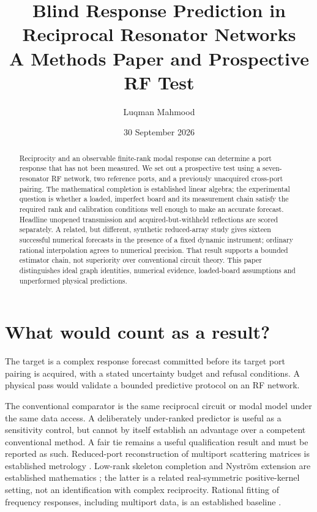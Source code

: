 \documentclass[11pt]{article}
\title{Blind Response Prediction in Reciprocal Resonator Networks\\
A Methods Paper and Prospective RF Test}
\author{Luqman Mahmood}
\date{30 September 2026}
\begin{document}
\maketitle
{}
\begin{abstract}
Reciprocity and an observable finite-rank modal response can determine a
port response that has not been measured. We set out a prospective test
using a seven-resonator RF network, two reference ports, and a previously
unacquired cross-port pairing. The mathematical completion is established
linear algebra; the experimental question is whether a loaded, imperfect
board and its measurement chain satisfy the required rank and calibration
conditions well enough to make an accurate forecast. Headline unopened
transmission and acquired-but-withheld reflections are scored separately.
A related, but different, synthetic reduced-array study gives sixteen successful
numerical forecasts in the presence of a fixed dynamic instrument;
ordinary rational interpolation agrees to numerical precision. That result
supports a bounded estimator chain, not superiority over conventional
circuit theory. This paper distinguishes ideal graph identities, numerical
evidence, loaded-board assumptions and unperformed physical predictions.
\end{abstract}

\section{What would count as a result?}
The target is a complex response forecast committed before its target
port pairing is acquired, with a stated uncertainty budget and refusal
conditions. A physical pass would validate a bounded predictive protocol
on an RF network.

The conventional comparator is the same reciprocal circuit or modal model
under the same data access. A deliberately under-ranked predictor is useful
as a sensitivity control, but cannot by itself establish an advantage over
a competent conventional method. A fair tie remains a useful qualification
result and must be reported as such. Reduced-port reconstruction of
multiport scattering matrices is established metrology \cite{TippetSpeciale}.
Low-rank skeleton completion and Nystr\"om extension are established
mathematics \cite{Skeleton,Nystrom}; the latter is a related real-symmetric
positive-kernel setting, not an identification with complex reciprocity.
Rational fitting of frequency
responses, including multiport data, is an established baseline
\cite{VectorFit,MatrixVF}.
\end{document}
